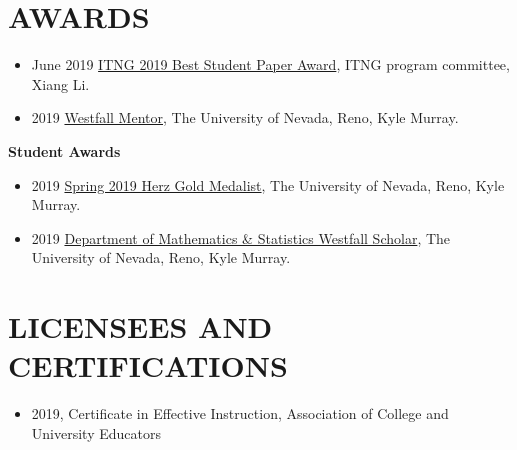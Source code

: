 \documentclass[paper=a4,fontsize=11pt]{scrartcl} %
\newcommand{\NewPart}[2]{\section*{\uppercase{#1} #2 }}
\begin{document}
\NewPart{Awards}{}
\vspace{-7pt}

\begin{itemize}[noitemsep]
      \item June 2019 \href{https://http://www.itng.info/}{ITNG 2019 Best Student Paper Award}, ITNG program committee, Xiang Li.
    \item 2019 \href{https://www.unr.edu/science/student-resources/student-competitions-awards}{Westfall Mentor}, The University of Nevada, Reno, Kyle Murray.
\end{itemize}

\textbf{Student Awards}

\begin{itemize}[noitemsep]
\item 2019 \href{https://www.unr.edu/nevada-today/news/2019/spring-2019-herz-gold-medalist?utm_source=newsletter051619&utm_medium=email&utm_content=kylemurray&utm_campaign=NevadaWeekly}{Spring 2019 Herz Gold Medalist}, The University of Nevada, Reno, Kyle Murray.
  \item 2019 \href{https://www.unr.edu/science/student-resources/student-competitions-awards}{Department of Mathematics \& Statistics Westfall Scholar}, The University of Nevada, Reno, Kyle Murray.

\vspace{-7pt}
\end{itemize}  



\NewPart{Licensees and Certifications}{}
\vspace{-7pt}

\begin{itemize}[noitemsep]
    \item 2019, Certificate in Effective Instruction, Association of College and University Educators
\end{itemize}
\end{document}
